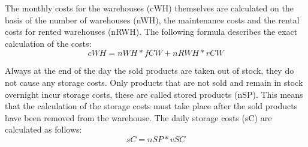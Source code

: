 The monthly costs for the warehouses (\gls{cWH}) themselves are calculated on the basis of the number of warehouses (\gls{nWH}), the maintenance costs and the rental costs for rented warehouses (\gls{nRWH}). The following formula describes the exact calculation of the costs:
\begin{equation}
\label{func:cWH} %
     cWH = nWH * fCW + nRWH * rCW
\end{equation}

Always at the end of the day the sold products are taken out of stock, they do not cause any storage costs. Only products that are not sold and remain in stock overnight incur storage costs, these are called stored products (\gls{nSP}). This means that the calculation of the storage costs must take place after the sold products have been removed from the warehouse. The daily storage costs (\gls{sC}) are calculated as follows:
\begin{equation}
\label{func:SC} %
    sC = nSP * vSC
\end{equation}